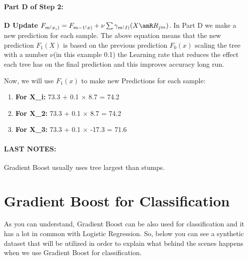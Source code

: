 \documentclass[12pt, a4paper]{article} %
\begin{document}
\paragraph{Part D of Step 2:} \textbf{D Update} $F_{m^(x_{i})} = F_{m -1^(x)} + \nu \sum \gamma_{m^(I)}(X \amR R_{jm})$. In Part D we make a new prediction for each sample. The above equation means that the new prediction $F_{1}(X)$ is based on the previous prediction $F_{0}(x)$ scaling the tree with a number $\nu$(in this example 0.1) the Learning rate that reduces the effect each tree has on the final prediction and this improves accuracy long run. 

Now, we will use $F_{1}(x)$ to make new Predictions for each sample:

\begin{enumerate}

\item \textbf{For X_{i}:} 73.3 + 0.1 $\times$ 8.7 = 74.2

\item \textbf{For X_{2}:} 73.3 + 0.1 $\times$ 8.7 = 74.2

\item \textbf{For X_{3}:} 73.3 + 0.1 $\times$ -17.3 = 71.6

\end{enumerate}

\paragraph{LAST NOTES:} Gradient Boost usually uses tree largest than stumps.

\section{Gradient Boost for Classification}

As you can understand, Gradient Boost can be also used for classification and it has a lot in common with Logistic Regression. So, below you can see a synthetic dataset that will be utilized in order to explain what behind the scenes happens when we use Gradient Boost for classification.
\end{document}
